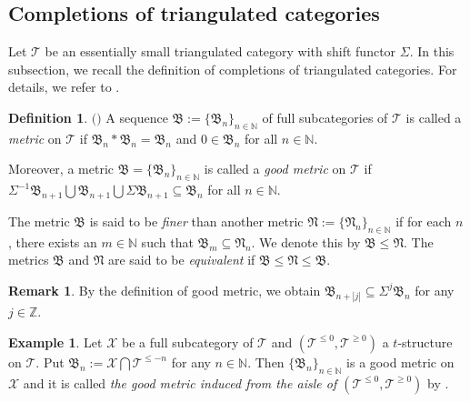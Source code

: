 \documentclass[11pt,a4paper]{amsart}
\numberwithin{equation}{section} \theoremstyle{plain}
\numberwithin{equation}{section} \theoremstyle{definition}
\newtheorem{definition}[lem]{Definition}
\newtheorem{Ex}[lem]{Example}
\newtheorem{rem}[lem]{Remark}
\newenvironment{rmk}{\begin{rem}\rm}{\end{rem}}
\newenvironment{df}{\begin{definition}\rm}{\end{definition}}
\newenvironment{ex}{\begin{Ex}\rm}{\end{Ex}}
\begin{document}
\subsection{Completions of triangulated categories}
\noindent

Let $\mathcal{T}$ be an essentially small triangulated category with shift functor $\Sigma$. In this subsection, we recall the definition of completions of triangulated categories. For details, we refer to \cite{N1, N2, BCRPZ}.

\begin{df}$($\cite[Definition 10]{N2}$)$ A sequence $\mathfrak{B}:=\{\mathfrak{B}_{n}\}_{n\in\mathbb{N}}$ of full subcategories of $\mathcal{T}$ is called a \emph{metric} on $\mathcal{T}$ if $\mathfrak{B}_{n}*\mathfrak{B}_{n}=\mathfrak{B}_{n}$ and $0\in\mathfrak{B}_{n}$ for all $n\in\mathbb{N}$.

Moreover, a metric $\mathfrak{B}=\{\mathfrak{B}_{n}\}_{n\in\mathbb{N}}$ is called a \emph{good metric} on $\mathcal{T}$ if $\Sigma^{-1}\mathfrak{B}_{n+1}\bigcup\mathfrak{B}_{n+1}\bigcup\Sigma\mathfrak{B}_{n+1}\subseteq\mathfrak{B}_{n}$ for all $n\in\mathbb{N}$.

The metric $\mathfrak{B}$ is said to be \emph{finer} than another metric $\mathfrak{N}:=\{\mathfrak{N}_{n}\}_{n\in\mathbb{N}}$ if for each $n$, there exists an $m\in\mathbb{N}$ such that $\mathfrak{B}_{m}\subseteq\mathfrak{N}_{n}$. We denote this by $\mathfrak{B}\leq\mathfrak{N}$. The metrics $\mathfrak{B}$ and $\mathfrak{N}$ are said to be \emph{equivalent} if $\mathfrak{B}\leq\mathfrak{N}\leq\mathfrak{B}$.
\end{df}

\begin{rmk}\label{rmk0} By the definition of good metric, we obtain $\mathfrak{B}_{n+|j|}\subseteq\Sigma^{j}\mathfrak{B}_{n}$ for any $j\in\mathbb{Z}$.
\end{rmk}


\begin{ex}\label{exa2} Let $\mathcal{X}$ be a full subcategory of $\mathcal{T}$ and $(\mathcal{T}^{\leq0},\mathcal{T}^{\geq0})$ a $t$-structure on $\mathcal{T}$. Put $\mathfrak{B}_{n}:=\mathcal{X}\bigcap\mathcal{T}^{\le-n}$ for any $n\in\mathbb{N}$. Then $\{\mathfrak{B}_{n}\}_{n\in\mathbb{N}}$ is a good metric on $\mathcal{X}$ and it is called \emph{the good metric induced from the aisle of $(\mathcal{T}^{\leq0},\mathcal{T}^{\geq0})$} by \cite[Definition 2.9]{BCRPZ}.
\end{ex}
\end{document}
